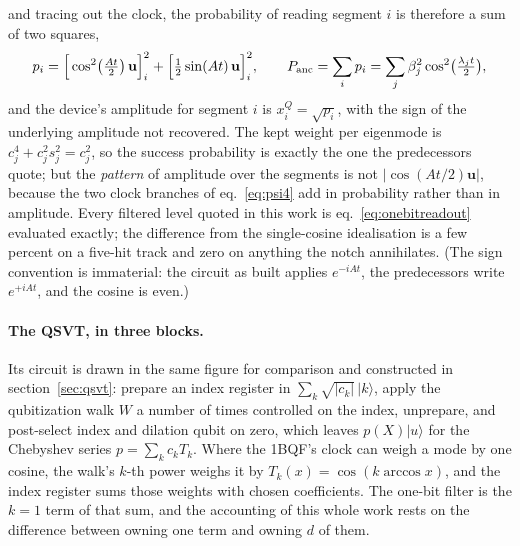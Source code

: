 \documentclass[11pt,a4paper]{article}
\begin{document}
and tracing out the clock, the probability of reading segment $i$ is
therefore a sum of two squares,
\begin{equation}
p_i=\Big[\cos^{2}\!\big(\tfrac{At}{2}\big)\,\mathbf{u}\Big]_i^{2}
+\Big[\tfrac12\sin(At)\,\mathbf{u}\Big]_i^{2},
\qquad
P_{\rm anc}=\sum_i p_i=\sum_j\beta_j^{2}\cos^{2}\!\big(\tfrac{\lambda_jt}{2}\big),
\label{eq:onebitreadout}
\end{equation}
and the device's amplitude for segment $i$ is $x^{Q}_i=\sqrt{p_i}$, with the
sign of the underlying amplitude not recovered. The kept weight per
eigenmode is $c_j^{4}+c_j^{2}s_j^{2}=c_j^{2}$, so the success probability is
exactly the one the predecessors quote; but the \emph{pattern} of amplitude
over the segments is not $|\cos(At/2)\mathbf{u}|$, because the two clock
branches of eq.~\eqref{eq:psi4} add in probability rather than in amplitude.
Every filtered level quoted in this work is eq.~\eqref{eq:onebitreadout}
evaluated exactly; the difference from the single-cosine idealisation is a
few percent on a five-hit track and zero on anything the notch annihilates.
(The sign convention is immaterial: the circuit as built applies
$e^{-iAt}$, the predecessors write $e^{+iAt}$, and the cosine is even.)

\paragraph{The QSVT, in three blocks.} Its circuit is drawn in the same
figure for comparison and constructed in section~\ref{sec:qsvt}: prepare an
index register in $\sum_k\sqrt{|c_k|}\,|k\rangle$, apply the qubitization
walk $W$ a number of times controlled on the index, unprepare, and
post-select index and dilation qubit on zero, which leaves
$p(X)|u\rangle$ for the Chebyshev series $p=\sum_kc_kT_k$. Where the 1BQF's
clock can weigh a mode by one cosine, the walk's $k$-th power weighs it by
$T_k(x)=\cos(k\arccos x)$, and the index register sums those weights with
chosen coefficients. The one-bit filter is the $k=1$ term of that sum, and
the accounting of this whole work rests on the difference between owning one
term and owning $d$ of them.
\end{document}
